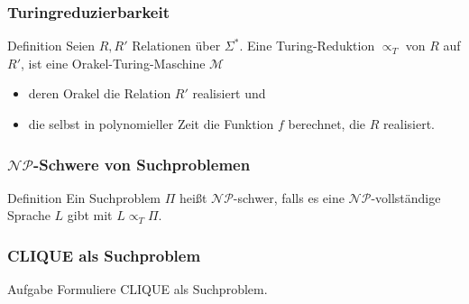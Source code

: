 

\begin{frame}
\frametitle{Turingreduzierbarkeit}
\begin{block}{Definition}
Seien $R, R'$ Relationen über $\Sigma^*$. Eine Turing-Reduktion $\propto_T$ von $R$ auf $R'$, ist eine Orakel-Turing-Maschine $\mathcal{M}$
\begin{itemize}
\item deren Orakel die Relation $R'$ realisiert und
\item die selbst in polynomieller Zeit die Funktion $f$ berechnet, die $R$ realisiert. 
\end{itemize}
\end{block}
\end{frame}

\begin{frame}
 \frametitle{$\mathcal{NP}$-Schwere von Suchproblemen}
 \begin{block}{Definition}
  Ein Suchproblem $\Pi$ heißt $\mathcal{NP}$-schwer, falls es eine $\mathcal{NP}$-vollständige Sprache $L$ gibt mit $L \propto_T \Pi$.
 \end{block}
\end{frame}

\begin{frame}
 \frametitle{CLIQUE als Suchproblem}
 \begin{block}{Aufgabe}
  Formuliere CLIQUE als Suchproblem.
 \end{block}
 \end{frame}
 
